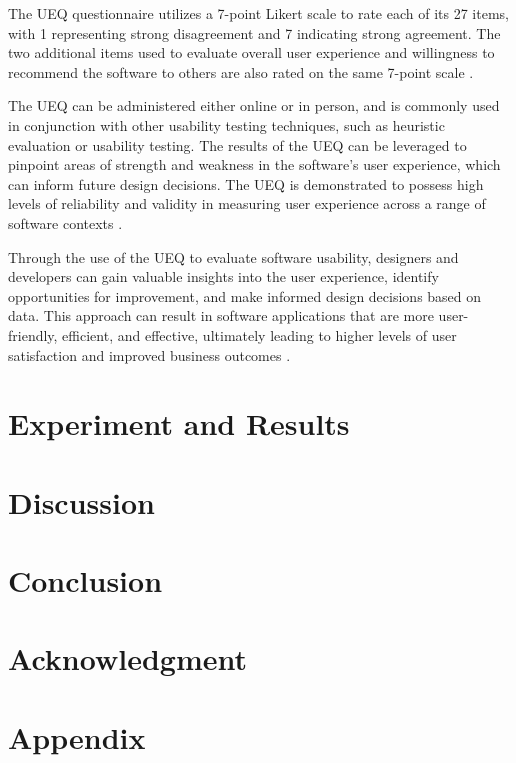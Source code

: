 \documentclass[conference,onecolumn]{IEEEtran}
\begin{document}
        The UEQ questionnaire utilizes a 7-point Likert scale to rate each of its 27 items, with 1 representing strong disagreement and 7 indicating strong agreement. The two additional items used to evaluate overall user experience and willingness to recommend the software to others are also rated on the same 7-point scale \cite{laugwitz2008construction}.

        The UEQ can be administered either online or in person, and is commonly used in conjunction with other usability testing techniques, such as heuristic evaluation or usability testing. The results of the UEQ can be leveraged to pinpoint areas of strength and weakness in the software's user experience, which can inform future design decisions. The UEQ is demonstrated to possess high levels of reliability and validity in measuring user experience across a range of software contexts \cite{hassenzahl2006user}.

        Through the use of the UEQ to evaluate software usability, designers and developers can gain valuable insights into the user experience, identify opportunities for improvement, and make informed design decisions based on data. This approach can result in software applications that are more user-friendly, efficient, and effective, ultimately leading to higher levels of user satisfaction and improved business outcomes \cite{brooke1996sus}.


\section{Experiment and Results}

\section{Discussion}


\section{Conclusion}
\section*{Acknowledgment}

\newpage
\section*{Appendix}

 
\newpage


\end{document}
